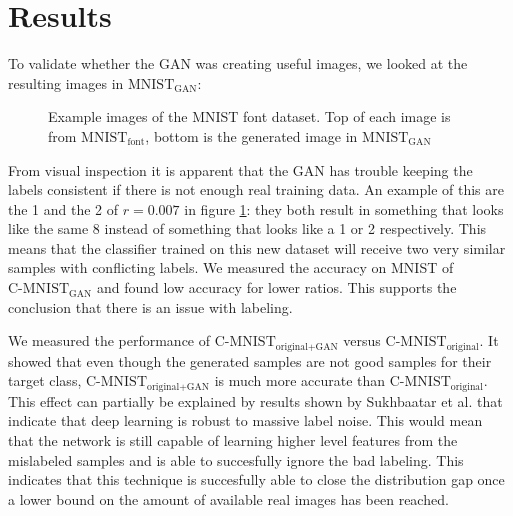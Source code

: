 \documentclass[10pt,twocolumn,letterpaper]{article}
\begin{document}
\clearpage

\section{Results}

To validate whether the GAN was creating useful images, we looked at the resulting images in $\text{MNIST}_\text{GAN}$:

\begin{figure}[h]
\begin{center}
\end{center}
   \caption{Example images of the MNIST font dataset. Top of each image is from $\text{MNIST}_\text{font}$, bottom is the generated image in $\text{MNIST}_\text{GAN}$ }
\label{fig:results}
\end{figure}

From visual inspection it is apparent that the GAN has trouble keeping the labels consistent if there is not enough real training data. An example of this are the 1 and the 2 of $r = 0.007$ in figure \ref{fig:results}: they both result in something that looks like the same 8 instead of something that looks like a 1 or 2 respectively. This means that the classifier trained on this new dataset will receive two very similar samples with conflicting labels. We measured the accuracy on MNIST of $\text{C-MNIST}_\text{GAN}$ and found low accuracy for lower ratios. This supports the conclusion that there is an issue with labeling.

We measured the performance of $\text{C-MNIST}_\text{original+GAN}$ versus $\text{C-MNIST}_\text{original}$. It showed that even though the generated samples are not good samples for their target class, $\text{C-MNIST}_\text{original+GAN}$ is much more accurate than $\text{C-MNIST}_\text{original}$. This effect can partially be explained by results shown by Sukhbaatar et al. that indicate that deep learning is robust to massive label noise. \cite{Sukhbaatar2014TrainingCN} This would mean that the network is still capable of learning higher level features from the mislabeled samples and is able to succesfully ignore the bad labeling. This indicates that this technique is succesfully able to close the distribution gap once a lower bound on the amount of available real images has been reached.
\end{document}
